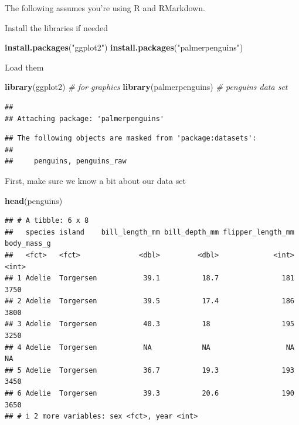 \documentclass[
]{book}
\newenvironment{Shaded}{\begin{snugshade}}{\end{snugshade}}
\newcommand{\CommentTok}[1]{\textcolor[rgb]{0.56,0.35,0.01}{\textit{#1}}}
\newcommand{\FunctionTok}[1]{\textcolor[rgb]{0.13,0.29,0.53}{\textbf{#1}}}
\newcommand{\NormalTok}[1]{#1}
\newcommand{\StringTok}[1]{\textcolor[rgb]{0.31,0.60,0.02}{#1}}
\begin{document}
The following assumes you're using R and RMarkdown.

Install the libraries if needed

\begin{Shaded}
\begin{Highlighting}[]
\FunctionTok{install.packages}\NormalTok{(}\StringTok{"ggplot2"}\NormalTok{)}
\FunctionTok{install.packages}\NormalTok{(}\StringTok{"palmerpenguins"}\NormalTok{)}
\end{Highlighting}
\end{Shaded}

Load them

\begin{Shaded}
\begin{Highlighting}[]
\FunctionTok{library}\NormalTok{(ggplot2) }\CommentTok{\# for graphics}
\FunctionTok{library}\NormalTok{(palmerpenguins) }\CommentTok{\# penguins data set}
\end{Highlighting}
\end{Shaded}

\begin{verbatim}
## 
## Attaching package: 'palmerpenguins'
\end{verbatim}

\begin{verbatim}
## The following objects are masked from 'package:datasets':
## 
##     penguins, penguins_raw
\end{verbatim}

First, make sure we know a bit about our data set

\begin{Shaded}
\begin{Highlighting}[]
\FunctionTok{head}\NormalTok{(penguins)}
\end{Highlighting}
\end{Shaded}

\begin{verbatim}
## # A tibble: 6 x 8
##   species island    bill_length_mm bill_depth_mm flipper_length_mm body_mass_g
##   <fct>   <fct>              <dbl>         <dbl>             <int>       <int>
## 1 Adelie  Torgersen           39.1          18.7               181        3750
## 2 Adelie  Torgersen           39.5          17.4               186        3800
## 3 Adelie  Torgersen           40.3          18                 195        3250
## 4 Adelie  Torgersen           NA            NA                  NA          NA
## 5 Adelie  Torgersen           36.7          19.3               193        3450
## 6 Adelie  Torgersen           39.3          20.6               190        3650
## # i 2 more variables: sex <fct>, year <int>
\end{verbatim}
\end{document}
